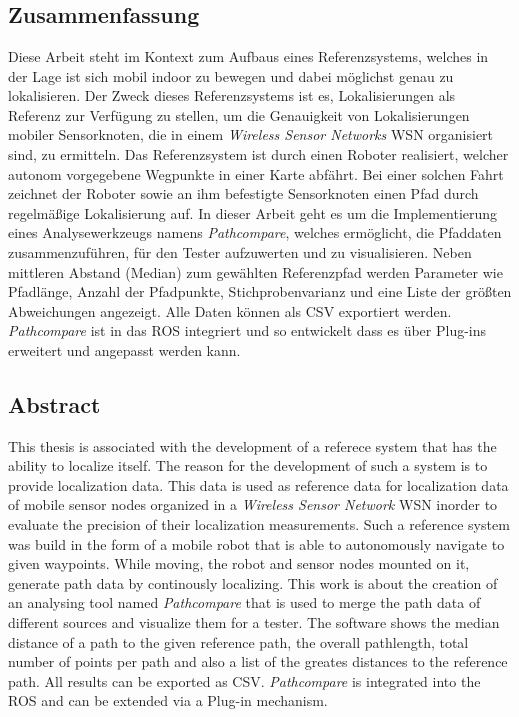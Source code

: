 \chapter*{\abstractname}
\section*{Zusammenfassung} Diese Arbeit steht im Kontext zum Aufbaus eines
Referenzsystems, welches in der Lage ist sich mobil indoor zu bewegen und dabei
möglichst genau zu lokalisieren.  Der Zweck dieses Referenzsystems ist es,
Lokalisierungen als Referenz zur Verfügung zu stellen, um die Genauigkeit von
Lokalisierungen mobiler Sensorknoten, die in einem \textit{Wireless Sensor
Networks} \gls{WSN} organisiert sind, zu ermitteln. Das Referenzsystem ist
durch einen Roboter realisiert, welcher autonom vorgegebene Wegpunkte in einer
Karte abfährt. Bei einer solchen Fahrt zeichnet der Roboter sowie an ihm
befestigte Sensorknoten einen Pfad durch regelmäßige Lokalisierung auf. In
dieser Arbeit geht es um die Implementierung eines Analysewerkzeugs namens
\textit{Pathcompare}, welches ermöglicht, die Pfaddaten zusammenzuführen, für
den Tester aufzuwerten und zu visualisieren. Neben mittleren Abstand (Median)
zum gewählten Referenzpfad werden Parameter wie Pfadlänge, Anzahl der
Pfadpunkte, Stichprobenvarianz und eine Liste der größten Abweichungen angezeigt.  Alle Daten
können als \gls{CSV} exportiert werden.  \textit{Pathcompare} ist in das
\gls{ROS} integriert und so entwickelt dass es über Plug-ins erweitert und
angepasst werden kann. 


\section*{Abstract} This thesis is associated with the development of a
referece system that has the ability to localize itself. The reason for the
development of such a system is to provide localization data. This data is used
as reference data for localization data of mobile sensor nodes organized in a
\textit{Wireless Sensor Network} \gls{WSN} inorder to evaluate the precision of
their localization measurements. Such a reference system was build in the form
of a mobile robot that is able to autonomously navigate to given waypoints.
While moving, the robot and sensor nodes mounted on it, generate path data by
continously localizing. This work is about the creation of an analysing tool
named \textit{Pathcompare} that is used to merge the path data of different
sources and visualize them for a tester. The software shows the median distance
of a path to the given reference path, the overall pathlength, total number of
points per path and also a list of the greates distances to the reference path.
All results can be exported as \gls{CSV}. \textit{Pathcompare} is integrated
into the \gls{ROS} and can be extended via a Plug-in mechanism.
